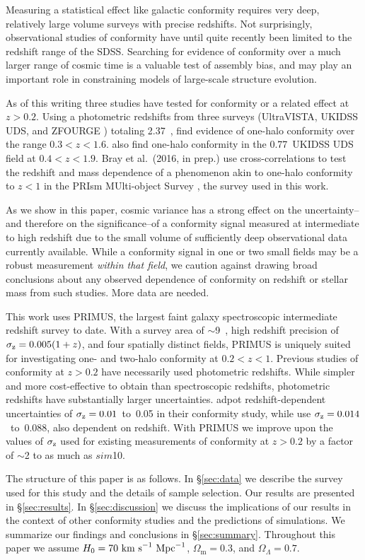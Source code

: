 Measuring a statistical effect like galactic conformity requires very deep, relatively large volume surveys with precise redshifts.
Not surprisingly, observational studies of conformity have until quite recently been limited to the redshift range of the SDSS.
Searching for evidence of conformity over a much larger range of cosmic time is a valuable test of assembly bias, and may play an important role in constraining models of large-scale structure evolution.

As of this writing three studies have tested for conformity or a related effect at $z>0.2$.
Using a photometric redshifts from three surveys (UltraVISTA, UKIDSS UDS, and ZFOURGE ) totaling 2.37~\degsq, \citet{Kawinwanichakij16} find evidence of one-halo conformity over the range $0.3 < z < 1.6$.
\citet{Hartley15} also find one-halo conformity in the 0.77~\degsq UKIDSS UDS field at $0.4 < z < 1.9$.
Bray et al.~(2016, in prep.) use cross-correlations to test the redshift and mass dependence of a phenomenon akin to one-halo conformity to $z<1$ in the PRIsm MUlti-object Survey \citep[PRIMUS;][]{Coil11, Cool13}, the survey used in this work.

As we show in this paper, cosmic variance has a strong effect on the uncertainty--and therefore on the significance--of a conformity signal measured at intermediate to high redshift due to the small volume of sufficiently deep observational data currently available.
While a conformity signal in one or two small fields may be a robust measurement \emph{within that field}, we caution against drawing broad conclusions about any observed dependence of conformity on redshift or stellar mass from such studies.  More data are needed.

This work uses PRIMUS, the largest faint galaxy spectroscopic intermediate redshift survey to date.
With a survey area of $\sim$9~\degsq, high redshift precision of $\sigmaz=0.005(1+z)$, and four spatially distinct fields, PRIMUS is uniquely suited for investigating one- and two-halo conformity at $0.2<z<1$.
Previous studies of conformity at $z>0.2$ have necessarily used photometric redshifts.
While simpler and more cost-effective to obtain than spectroscopic redshifts, photometric redshifts have substantially larger uncertainties.
\citet{Kawinwanichakij16} adpot redshift-dependent uncertainties of $\sigmaz=0.01$~to~0.05 in their conformity study,
while \citet{Hartley15} use $\sigmaz=0.014$~to~0.088, also dependent on redshift.
With PRIMUS we improve upon the values of $\sigmaz$ used for existing measurements of conformity at $z>0.2$ by a factor of $\sim$2 to as much as $sim$10.

The structure of this paper is as follows.
In \S\ref{sec:data} we describe the survey used for this study and the details of sample selection.
Our results are presented in \S\ref{sec:results}.
In \S\ref{sec:discussion} we discuss the implications of our results in the context of other conformity studies and the predictions of simulations.
We summarize our findings and conclusions in \S\ref{sec:summary}.
Throughout this paper we assume $H_{0}=70~\textrm{km~s}^{-1}~\textrm{Mpc}^{-1}$, $\Omega_{\textrm{m}}=0.3$, and $\Omega_{\Lambda}=0.7$.
